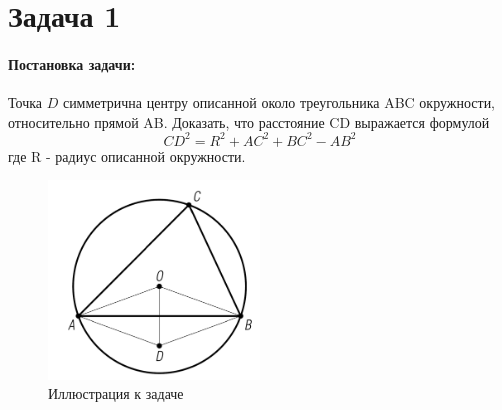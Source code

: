 {
    \section*{Задача 1}
    \paragraph{Постановка задачи:}
    Точка \(D\) симметрична центру описанной около треугольника ABC окружности, относительно прямой AB.
    Доказать, что расстояние CD выражается формулой
    \begin{equation}
        CD^2 = R^2 +AC^2 + BC^2 - AB^2
        \label{t1:f1}
    \end{equation}
    где R - радиус описанной окружности.
    \begin{figure}[h]
        \centering
        \includegraphics[width=0.5\textwidth]{images/task1.png}
        \caption{Иллюстрация к задаче}
        \label{t1:im}
    \end{figure}
}
